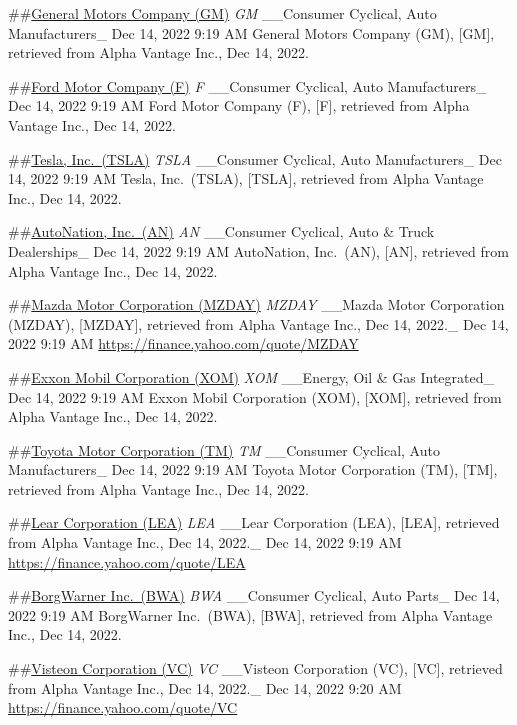\documentclass[
]{article}
\begin{document}
\#\#\href{https://finance.yahoo.com/quote/GM}{General Motors Company
(GM)} \emph{GM} \_\_Consumer Cyclical, Auto Manufacturers\_ Dec 14, 2022
9:19 AM General Motors Company (GM), {[}GM{]}, retrieved from Alpha
Vantage Inc., Dec 14, 2022.

\#\#\href{https://finance.yahoo.com/quote/F}{Ford Motor Company (F)}
\emph{F} \_\_Consumer Cyclical, Auto Manufacturers\_ Dec 14, 2022 9:19
AM Ford Motor Company (F), {[}F{]}, retrieved from Alpha Vantage Inc.,
Dec 14, 2022.

\#\#\href{https://finance.yahoo.com/quote/TSLA}{Tesla, Inc.~(TSLA)}
\emph{TSLA} \_\_Consumer Cyclical, Auto Manufacturers\_ Dec 14, 2022
9:19 AM Tesla, Inc.~(TSLA), {[}TSLA{]}, retrieved from Alpha Vantage
Inc., Dec 14, 2022.

\#\#\href{https://finance.yahoo.com/quote/AN}{AutoNation, Inc.~(AN)}
\emph{AN} \_\_Consumer Cyclical, Auto \& Truck Dealerships\_ Dec 14,
2022 9:19 AM AutoNation, Inc.~(AN), {[}AN{]}, retrieved from Alpha
Vantage Inc., Dec 14, 2022.

\#\#\href{MZDAY}{Mazda Motor Corporation (MZDAY)} \emph{MZDAY} \_\_Mazda
Motor Corporation (MZDAY), {[}MZDAY{]}, retrieved from Alpha Vantage
Inc., Dec 14, 2022.\_ Dec 14, 2022 9:19 AM
\url{https://finance.yahoo.com/quote/MZDAY}

\#\#\href{https://finance.yahoo.com/quote/XOM}{Exxon Mobil Corporation
(XOM)} \emph{XOM} \_\_Energy, Oil \& Gas Integrated\_ Dec 14, 2022 9:19
AM Exxon Mobil Corporation (XOM), {[}XOM{]}, retrieved from Alpha
Vantage Inc., Dec 14, 2022.

\#\#\href{https://finance.yahoo.com/quote/TM}{Toyota Motor Corporation
(TM)} \emph{TM} \_\_Consumer Cyclical, Auto Manufacturers\_ Dec 14, 2022
9:19 AM Toyota Motor Corporation (TM), {[}TM{]}, retrieved from Alpha
Vantage Inc., Dec 14, 2022.

\#\#\href{LEA}{Lear Corporation (LEA)} \emph{LEA} \_\_Lear Corporation
(LEA), {[}LEA{]}, retrieved from Alpha Vantage Inc., Dec 14, 2022.\_ Dec
14, 2022 9:19 AM \url{https://finance.yahoo.com/quote/LEA}

\#\#\href{https://finance.yahoo.com/quote/BWA}{BorgWarner Inc.~(BWA)}
\emph{BWA} \_\_Consumer Cyclical, Auto Parts\_ Dec 14, 2022 9:19 AM
BorgWarner Inc.~(BWA), {[}BWA{]}, retrieved from Alpha Vantage Inc., Dec
14, 2022.

\#\#\href{VC}{Visteon Corporation (VC)} \emph{VC} \_\_Visteon
Corporation (VC), {[}VC{]}, retrieved from Alpha Vantage Inc., Dec 14,
2022.\_ Dec 14, 2022 9:20 AM \url{https://finance.yahoo.com/quote/VC}
\end{document}
